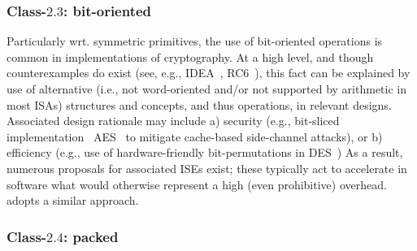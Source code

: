 

\subsubsection{Class-$2.3$: bit-oriented}
\label{sec:bg:feature:2:3}

Particularly wrt. symmetric primitives, the use of bit-oriented operations 
is common in implementations of cryptography.  At a high level, and though 
counterexamples do exist 
(see, e.g., IDEA~\cite{SCARV:LaiMas:90}, RC6~\cite{SCARV:RRSY:98}),
this fact can be explained by use of alternative (i.e., not word-oriented
and/or not supported by arithmetic in most ISAs) structures and concepts,
and thus operations, in relevant designs.  Associated design rationale may
include
a) security
   (e.g., bit-sliced implementation~\cite{SCARV:KasSch:09} AES~\cite{SCARV:FIPS:197} to mitigate cache-based side-channel attacks),
   or
b) efficiency
   (e.g., use of hardware-friendly bit-permutations in DES~\cite{SCARV:FIPS:46_3})
As a result, numerous proposals for associated ISEs exist; these typically
act to accelerate in software what would otherwise represent a high (even 
prohibitive) overhead.  \XCID adopts a similar approach.


\subsubsection{Class-$2.4$: packed}
\label{sec:bg:feature:2:4}

